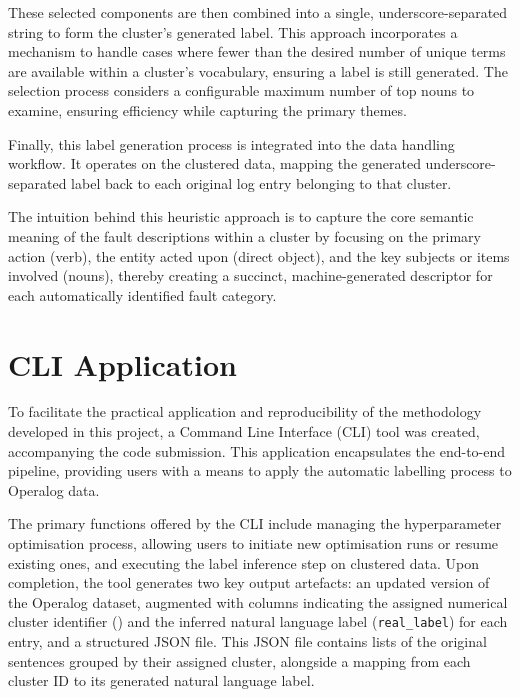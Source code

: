 \documentclass[10pt,oneside]{report}
\begin{document}
These selected components are then combined into a single, underscore-separated string to form the cluster's generated label. This approach incorporates a mechanism to handle cases where fewer than the desired number of unique terms are available within a cluster's vocabulary, ensuring a label is still generated. The selection process considers a configurable maximum number of top nouns to examine, ensuring efficiency while capturing the primary themes.

Finally, this label generation process is integrated into the data handling workflow. It operates on the clustered data, mapping the generated underscore-separated label back to each original log entry belonging to that cluster.

The intuition behind this heuristic approach is to capture the core semantic meaning of the fault descriptions within a cluster by focusing on the primary action (verb), the entity acted upon (direct object), and the key subjects or items involved (nouns), thereby creating a succinct, machine-generated descriptor for each automatically identified fault category.

\section{CLI Application}\label{sec:CLI}

To facilitate the practical application and reproducibility of the methodology developed in this project, a Command Line Interface (CLI) tool was created, accompanying the code submission. This application encapsulates the end-to-end pipeline, providing users with a means to apply the automatic labelling process to Operalog data.

The primary functions offered by the CLI include managing the hyperparameter optimisation process, allowing users to initiate new optimisation runs or resume existing ones, and executing the label inference step on clustered data. Upon completion, the tool generates two key output artefacts: an updated version of the Operalog dataset, augmented with columns indicating the assigned numerical cluster identifier () and the inferred natural language label (\texttt{real\_label}) for each entry, and a structured JSON file. This JSON file contains lists of the original sentences grouped by their assigned cluster, alongside a mapping from each cluster ID to its generated natural language label.
\end{document}
